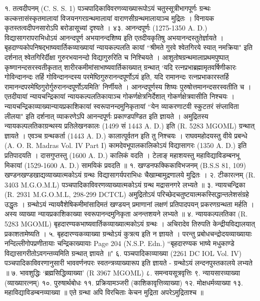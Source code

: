 १. तत्वदीपनम् (C. S. S. 1)
पञ्चपादिकाविवरणव्याख्यारूपोऽयं चतुस्सूत्रीभागपूर्णः ग्रन्थः कल्कत्तासंस्कृतमालायां विजयनगरग्रन्थमालायां वाराणसीग्रन्थमालायाञ्च मुद्रितः । विनायक कृतस्तत्वदीपनसारोऽपि बरोडासूच्यां दृश्यते ।
४३. आनन्दपूर्णः (1275-1350 A. D.)
विद्यासागरापराभिधोऽयं आनन्दपूर्ण अभयानन्दशिष्य इति एतदीयकृतिषु अभयानन्दस्तुतेर्ज्ञायते । बृहदाण्यकोपनिषद्भाष्यवार्तिकव्याख्यायां न्यायकल्पलति कायां ``श्रीमते गुरवे श्वेतगिरये स्यात् नमक्रिया" इति दर्शनात् श्वेतगिरिर्दीक्षा गुरुरभयानन्दो विद्यागुरुरिति च निश्चियते । आशुतोषग्रन्थमालाप्रथमपुष्पात् कृष्णानन्दसरस्वतीकृतात् शारीरकमीमांसाभाष्यवार्तिकाख्यात् ग्रन्थात् `यदि रत्नप्रभाब्रह्मामृतवर्षिणीकारः गोविन्दानन्दः तर्हि गोविन्दानन्दस्य परमेष्ठिगुरुरानन्दपूर्णोऽयं इति, यदि रामानन्दः रत्नप्रभाकारस्तर्हि रामानन्दपरमेष्ठिगुरोर्गुरुरानन्दपूर्णोऽयमिति' निर्णीयते । आनन्दपूर्णस्य शिष्यः पुरुषोत्तमानन्दसरस्वतीति च ।
एतदीयायां न्यायचन्द्रिकायां न्यायकल्पलतिकायाञ्च गोकर्णक्षेत्रनिर्देशात् गोकर्णक्षेत्रवासीति निश्चयः । न्यायचन्द्रिकाव्याख्यान्यायप्रकाशिकायां स्वरूपानन्दमुनिकृतायां ``येन व्याकरणाटवी स्कुटतरं संप्लाविता लीलया" इति दर्शनात् व्याकरणेऽपि आनन्दपूर्णः प्रकाण्डपण्डित इति ज्ञायते । अमुद्रितस्य न्यायकल्पलतिकाग्रन्थस्य प्रतिलेखनकालः (1499 सं  1443 A. D.) इति (R. 5283 MGOML) ग्रन्थात् ज्ञायते । एवञ्च ग्रन्थकर्ता (1443 A. D.) कालात्पूर्वतन इति तु निश्चयः । राघवमहोदयस्तु वीये प्रबन्धे (A. O. R. Madras Vol. IV Part I) कामदेवभूपालकालिकोऽयं विद्यासागरः (1350 A. D.) इति प्रतिपादयति । दासगुप्तस्तु (1600 A. D.) कालिकं वदति । टेलाङ् महाशयस्तु महाविद्याविडम्बनभू मिकायां (1529-1600 A. D.) सामयिकं प्रवदति ॥
१. खण्डनफक्किकाविभजनम् (B.S.S 81, 109)
खण्डनखण्डखाद्यव्याख्यात्मकोऽयं ग्रन्थः विद्यासागर्यपराभिधः चैखाम्बामुद्रणालये मुद्रितः ।
२. टीकारत्नम् (R. 3403 M.G.O.M.L) पञ्चपादिकाविवरणव्याख्यात्मकोऽयं ग्रन्थ मद्रासनगरे लभ्यते ॥
३. न्यायचन्द्रिका (R. 2931 M.G.O.M.L, 298-299 DCTCL)
अमुद्रितोऽयं परिच्छेदचतुष्टयात्मकस्सिद्धान्तलेशसंग्रहे उद्धृतः । ग्रन्थोऽयं न्यायवैशेषिकमीमांसादिमतं खण्डयन् प्रमाणानां लक्षणं प्रतिपादपयन् प्रकरणग्रन्थता मर्हति । अस्य व्याख्या न्यायप्रकाशिकाख्या स्वरूपानन्दमुनिकृता अनन्तशयने लभ्यते ॥
४. न्यायकल्पलतिका (R. 5283 MGOML)
बृहदारण्यकभाष्यवार्तिकव्याख्यात्मकोऽयं ग्रन्थः । अचिरादेव तिरुपति केन्द्रीयविद्यालयात् प्रकाशतामेष्यति ।
५. बृहदारण्यकव्याख्या
ग्रन्थोऽयं कुत्रत्य इति न ज्ञायते । परन्तु प्रबोधचन्द्रोदयव्याख्यायाः नन्दिल्लीगोपप्रणीतायाः चन्द्रिकाख्यायाः Page 204 (N.S.P. Edn.) ``बृहदारण्यक भाष्ये मधुकाण्डे विद्यासागरीतोऽवगन्तव्यमिति ग्रन्थात् ज्ञायते ॥"
६. पञ्चपादिकाव्याख्या (2261 DC IOL Vol. IV)
पञ्चपादिकाविवरणानुसारी भाववर्णनपरः स्वतन्त्रव्याख्यारूप इति ज्ञायते - ग्रन्थोऽयं लन्दनपुस्तकालये लभ्यते ॥
७. भावशुद्धिः `ब्रह्मसिद्धिव्याख्या' (R 3967 MGOML) ८. समन्वयसूत्रवृत्तिः ९. न्यायसारव्याख्या (व्याख्यारत्नम्) १०. पुरुषार्थबोधः ११. प्रक्रियामञ्जरी (काशिकावृत्तिव्याख्या) १२. मोक्षधर्मव्याख्या १३. महाविद्याविडम्बनव्याख्या ॥ एते ग्रन्था अपि विरचिताः केचन मुद्रिता अपरेऽमुद्रिताश्च ॥
